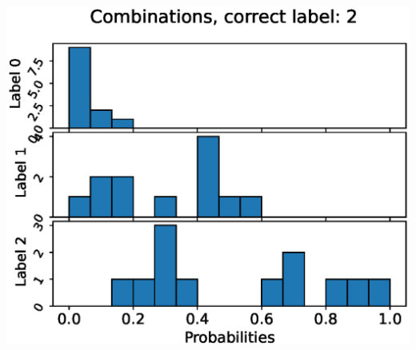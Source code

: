 \begin{center}
\begin{minipage}{0.33\textwidth}
  \includegraphics[width=\textwidth]{files/figs/app/hists/trunk/c2.eps}
\end{minipage}


\end{center}
